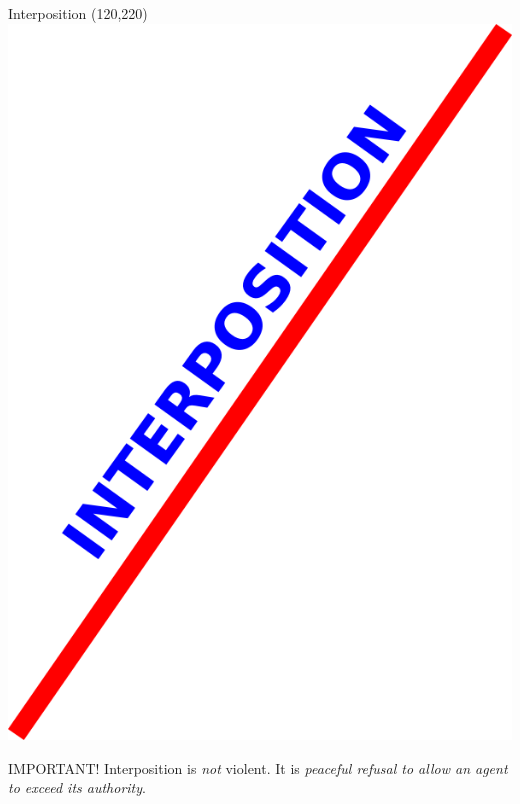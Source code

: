 \begin{frame}{Interposition}
    \Put(120,220){\includegraphics[height=0.8\textheight]{img/line.png}}
\end{frame}

\begin{frame}
    \begin{block}{IMPORTANT!}
        { \huge Interposition is \emph{not} violent. It is \emph{peaceful refusal to allow an agent to exceed its authority}.}
    \end{block}
\end{frame}


